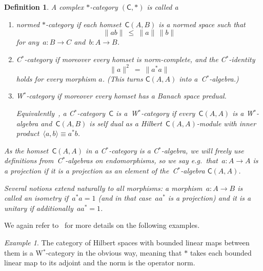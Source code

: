 \documentclass[reqno,T1,11pt]{amsproc}
\newcommand{\cat}[1]{\mathsf{#1}}		%
\theoremstyle{plain}
\newtheorem{defn}[thm]{Definition}
\theoremstyle{remark}
\newtheorem{ex}[thm]{Example}
\numberwithin{equation}{section}
\begin{document}
\begin{defn}
A complex $*$-category $(\cat{C},*)$ is called a
\begin{enumerate}
	\item \emph{normed $*$-category} if each homset~$\cat{C}(A,B)$ is a normed space such that
	    \[
		    \| ab \| \ \leq\  \|a\| \, \|b\|
	    \]
                for any~$a\colon B \to C$ and~$b\colon A \to B$.
	\item\label{Cstarcat}
    \emph{C$^*$-category} if moreover every homset is norm-complete, and the C$^*$-identity
    \[
	\|a \|^2\  =\  \|a^*a\|
     \]
	holds for every morphism $a$.
        (This turns $\cat{C}(A,A)$ into a~C$^*$-algebra.)
\item\label{Wstarcat}
    \emph{W$^*$-category} if moreover every homset has a Banach space predual.
        
	Equivalently~\cite[Prop.~2.15]{wstarcat}, a C$^*$-category~$\cat{C}$
            is a~W$^*$-category
            if every~$\cat{C}(A,A)$ is a W$^*$-algebra
            and~$\cat{C}(A,B)$ is self dual
            as a Hilbert~$\cat{C}(A,A)$-module
            with inner product~$\langle a,b\rangle \equiv a^*b$.
\end{enumerate}
As the homset~$\cat{C}(A,A)$
    in a C$^*$-category
    is a C$^*$-algebra,
    we will freely use definitions from~C$^*$-algebras on endomorphisms,
    so we say e.g.~that~$a\colon A \to A$ is a \emph{projection} if it is a projection as an element of the~C$^*$-algebra $\cat{C}(A,A)$.

Several notions extend naturally to all morphisms:
    a morphism~$a \colon A \to B$ is called an \emph{isometry} if~$a^*a=1$
        (and in that case~$aa^*$ is a projection)
        and it is a \emph{unitary} if additionally~$aa^*=1$.
\end{defn}


We again refer to~\cite{wstarcat} for more details on the following examples.

\begin{ex}
The category of Hilbert spaces with bounded linear maps between them
    is a W$^*$-category in the obvious way, meaning that $*$ takes each bounded linear map to its adjoint and the norm is the operator norm.
\end{ex}
\end{document}
